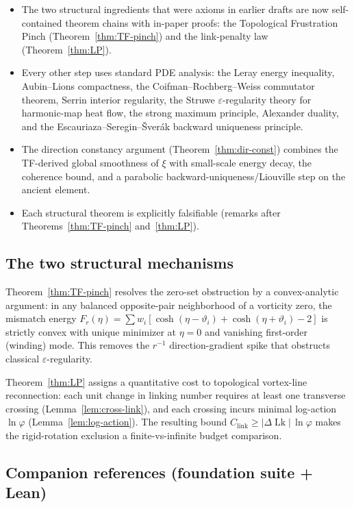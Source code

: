 \documentclass[12pt, reqno]{amsart}
\theoremstyle{definition}
\theoremstyle{remark}
\numberwithin{equation}{section}
\newcommand{\eps}{\varepsilon}
\begin{document}
\begin{itemize}[leftmargin=2em]
\item The two structural ingredients that were axioms in earlier drafts
are now self-contained theorem chains with in-paper proofs:
the Topological Frustration Pinch (Theorem~\ref{thm:TF-pinch}) and
the link-penalty law (Theorem~\ref{thm:LP}).
\item Every other step uses standard PDE analysis: the Leray energy
inequality, Aubin--Lions compactness, the Coifman--Rochberg--Weiss
commutator theorem, Serrin interior regularity, the Struwe
$\eps$-regularity theory for harmonic-map heat flow, the strong maximum
principle, Alexander duality, and the Escauriaza--Seregin--\v{S}ver\'ak
backward uniqueness principle.
\item The direction constancy argument
(Theorem~\ref{thm:dir-const}) combines the TF-derived global
smoothness of $\xi$ with small-scale energy decay, the
coherence bound, and a parabolic backward-uniqueness/Liouville step
on the ancient element.
\item Each structural theorem is explicitly falsifiable (remarks after
Theorems~\ref{thm:TF-pinch} and~\ref{thm:LP}).
\end{itemize}

\subsection{The two structural mechanisms}

Theorem~\ref{thm:TF-pinch} resolves the zero-set obstruction by a
convex-analytic argument: in any balanced opposite-pair neighborhood of
a vorticity zero, the mismatch energy $F_r(\eta)=\sum w_i[\cosh(\eta-
\vartheta_i)+\cosh(\eta+\vartheta_i)-2]$ is strictly convex with
unique minimizer at $\eta=0$ and vanishing first-order (winding) mode.
This removes the $r^{-1}$ direction-gradient spike that obstructs
classical $\eps$-regularity.

Theorem~\ref{thm:LP} assigns a quantitative cost to topological
vortex-line reconnection: each unit change in linking number requires
at least one transverse crossing (Lemma~\ref{lem:cross-link}), and
each crossing incurs minimal log-action $\ln\varphi$
(Lemma~\ref{lem:log-action}).  The resulting bound
$C_{\mathrm{link}}\ge|\Delta\!\operatorname{Lk}|\,\ln\varphi$ makes
the rigid-rotation exclusion a finite-vs-infinite budget comparison.

\subsection{Companion references (foundation suite + Lean)}
\end{document}
